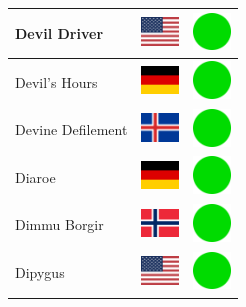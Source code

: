 \documentclass[12pt, a4paper, twoside]{report}
\begin{document}
\begin{center}
\begin{longtable}{|p{5cm}|p{2cm}|p{2cm}|}
 Devil Driver                                               & \includegraphics[width=1cm]{../img/flags/us} &   \includegraphics[width=1cm]{../likes/y} \\ \hline
 Devil's Hours                                              & \includegraphics[width=1cm]{../img/flags/de} &   \includegraphics[width=1cm]{../likes/y} \\ \hline
 Devine Defilement                                          & \includegraphics[width=1cm]{../img/flags/is} &   \includegraphics[width=1cm]{../likes/y} \\ \hline
 Diaroe                                                     & \includegraphics[width=1cm]{../img/flags/de} &   \includegraphics[width=1cm]{../likes/y} \\ \hline
 Dimmu Borgir                                               & \includegraphics[width=1cm]{../img/flags/no} &   \includegraphics[width=1cm]{../likes/y} \\ \hline
 Dipygus                                                    & \includegraphics[width=1cm]{../img/flags/us} &   \includegraphics[width=1cm]{../likes/y} \\ \hline

\end{longtable}
\end{center}
\end{document}
